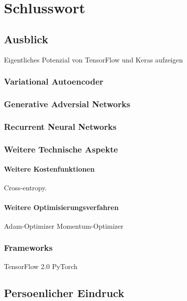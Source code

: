 \chapter*{Schlusswort}

\section*{Ausblick}
Eigentliches Potenzial von TensorFlow und Keras aufzeigen
\subsection*{Variational Autoencoder}
\subsection*{Generative Adversial Networks}
\subsection*{Recurrent Neural Networks}
\subsection*{Weitere Technische Aspekte}
\subsubsection*{Weitere Kostenfunktionen}
Cross-entropy.
\subsubsection*{Weitere Optimisierungsverfahren}
Adam-Optimizer
Momentum-Optimizer

\subsection*{Frameworks}
TensorFlow 2.0
PyTorch



\section*{Persoenlicher Eindruck}


